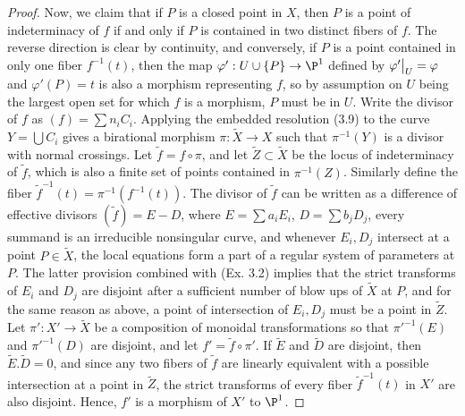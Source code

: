 \documentclass[a4paper]{article}
\begin{document}
\begin{enumerate} [label=\textbf{\arabic*.}, leftmargin=0em]
\begin{proof}
              Now, we claim that if $P$ is a closed point in $X$, then $P$ is a point of indeterminacy of $f$ if and only if $P$ is contained in two distinct fibers of $f$.
              The reverse direction is clear by continuity, and conversely, if $P$ is a point contained in only one fiber $f^{-1}(t)$, then the map $\varphi' : U \cup \{ P \} \to \P^1$ defined by $\restr{\varphi'}{U} = \varphi$ and $\varphi'(P) = t$ is also a morphism representing $f$, so by assumption on $U$ being the largest open set for which $f$ is a morphism, $P$ must be in $U$.
              Write the divisor of $f$ as $(f) = \sum n_i C_i$.
              Applying the embedded resolution (3.9) to the curve $Y = \bigcup C_i$ gives a birational morphism $\pi : \tilde{X} \to X$ such that $\pi^{-1}(Y)$ is a divisor with normal crossings.
              Let $\tilde{f} = f \circ \pi$, and let $\tilde{Z} \subset \tilde{X}$ be the locus of indeterminacy of $\tilde{f}$, which is also a finite set of points contained in $\pi^{-1}(Z)$.
              Similarly define the fiber $\tilde{f}^{-1}(t) = \pi^{-1}(f^{-1}(t))$.
              The divisor of $\tilde{f}$ can be written as a difference of effective divisors $(\tilde{f}) = E - D$, where $E = \sum a_i E_i$, $D = \sum b_j D_j$, every summand is an irreducible nonsingular curve, and whenever $E_i, D_j$ intersect at a point $P \in \tilde{X}$, the local equations form a part of a regular system of parameters at $P$.
              The latter provision combined with (Ex. 3.2) implies that the strict transforms of $E_i$ and $D_j$ are disjoint after a sufficient number of blow ups of $\tilde{X}$ at $P$, and for the same reason as above, a point of intersection of $E_i, D_j$ must be a point in $\tilde{Z}$.
              Let $\pi' : X' \to \tilde{X}$ be a composition of monoidal transformations so that $\pi'^{-1}(E)$ and $\pi'^{-1}(D)$ are disjoint, and let $f' = \tilde{f} \circ \pi'$.
              If $\tilde{E}$ and $\tilde{D}$ are disjoint, then $\tilde{E}.\tilde{D} = 0$, and since any two fibers of $\tilde{f}$ are linearly equivalent with a possible intersection at a point in $\tilde{Z}$, the strict transforms of every fiber $\tilde{f}^{-1}(t)$ in $X'$ are also disjoint.
              Hence, $f'$ is a morphism of $X'$ to $\P^1$.
          \end{proof}



\end{enumerate}
\end{document}

